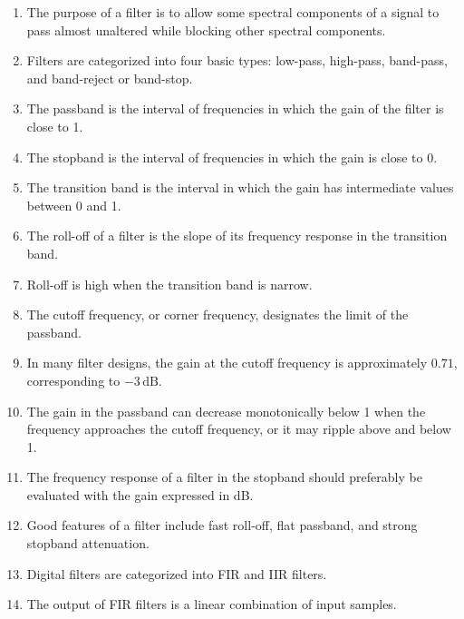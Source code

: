 \begin{enumerate}[label=\arabic*.]
    \item The purpose of a filter is to allow some spectral components of a signal to pass almost unaltered while blocking other spectral components.
    
    \item Filters are categorized into four basic types: low-pass, high-pass, band-pass, and band-reject or band-stop.
    
    \item The passband is the interval of frequencies in which the gain of the filter is close to 1.
    
    \item The stopband is the interval of frequencies in which the gain is close to 0.
    
    \item The transition band is the interval in which the gain has intermediate values between 0 and 1.
    
    \item The roll-off of a filter is the slope of its frequency response in the transition band.
    
    \item Roll-off is high when the transition band is narrow.
    
    \item The cutoff frequency, or corner frequency, designates the limit of the passband.
    
    \item In many filter designs, the gain at the cutoff frequency is approximately $0.71$, corresponding to $-3\,\text{dB}$.
    
    \item The gain in the passband can decrease monotonically below 1 when the frequency approaches the cutoff frequency, or it may ripple above and below 1.
    
    \item The frequency response of a filter in the stopband should preferably be evaluated with the gain expressed in dB.
    
    \item Good features of a filter include fast roll-off, flat passband, and strong stopband attenuation.
    
    \item Digital filters are categorized into FIR and IIR filters.
    
    \item The output of FIR filters is a linear combination of input samples.
    

\end{enumerate}
